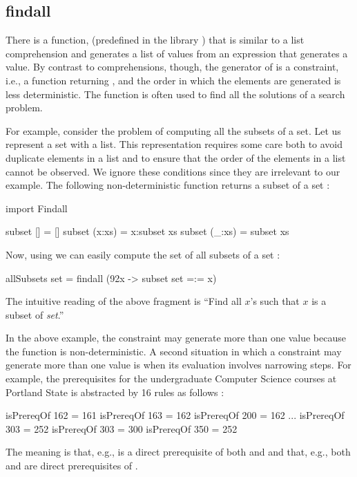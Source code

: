 \subsection{\selectfont findall}
\label{findall}

There is a function, 
(predefined in the library )
that is similar to a list comprehension and generates a list of values
from an expression that generates a value.
By contrast to comprehensions, though, the generator
of  is a constraint, i.e., a function returning
, and the order in which the elements are generated
is less deterministic.
The function  is often
used to find all the solutions of a search problem.

For example, consider the problem of computing all the subsets
of a set.  Let us represent a set with a list.
This representation requires some care both to avoid
duplicate elements in a list and to ensure that
the order of the elements in a list cannot be observed.
We ignore these conditions since they are irrelevant to our example.
The following non-deterministic function returns a
subset of a set
:
%
\begin{prog}
import Findall

subset []     = []
subset (x:xs) = x:subset xs
subset (_:xs) =   subset xs
\end{prog}
%
Now, using  we can easily compute the set of
all subsets of a set
:
%
\begin{prog}
allSubsets set = findall (\char92x -> subset set =:= x)
\end{prog}
%
The intuitive reading of the above fragment is ``Find all
$x$'s such that $x$ is a subset of \emph{set}.''

In the above example, the constraint may generate more than
one value because the function  is non-deterministic.
A second situation in which a constraint may generate more
than one value is when its evaluation involves narrowing
steps.
For example, the prerequisites for the undergraduate 
Computer Science courses at Portland State
is abstracted by 16 rules as follows
:
%
\begin{prog}
isPrereqOf 162 = 161
isPrereqOf 163 = 162
isPrereqOf 200 = 162
...
isPrereqOf 303 = 252
isPrereqOf 303 = 300
isPrereqOf 350 = 252
\end{prog}
%
The meaning is that, e.g.,  is a direct prerequisite of both
 and  and that, e.g., 
both  and  are direct prerequisites of .

